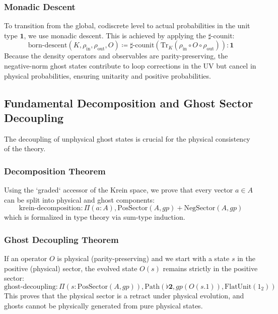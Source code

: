 \documentclass{article}
\begin{document}
\subsubsection{Monadic Descent}
To transition from the global, codiscrete level to actual probabilities in the unit type $\mathbf{1}$, we use monadic descent. This is achieved by applying the $\sharp$-counit:
\begin{equation}
    \text{born-descent}(K, \rho_{\text{in}}, \rho_{\text{out}}, O) \coloneqq \sharp\text{-counit}(\text{Tr}_K(\rho_{\text{in}} \circ O \circ \rho_{\text{out}})) : \mathbf{1}
\end{equation}
Because the density operators and observables are parity-preserving, the negative-norm ghost states contribute to loop corrections in the UV but cancel in physical probabilities, ensuring unitarity and positive probabilities.

\subsection{Fundamental Decomposition and Ghost Sector Decoupling}
\label{sec:decoupling}

The decoupling of unphysical ghost states is crucial for the physical consistency of the theory.

\subsubsection{Decomposition Theorem}
Using the `graded` accessor of the Krein space, we prove that every vector $a \in A$ can be split into physical and ghost components:
\begin{equation}
    \text{krein-decomposition} : \Pi(a:A), \text{PosSector}(A, gp) + \text{NegSector}(A, gp)
\end{equation}
which is formalized in type theory via sum-type induction.

\subsubsection{Ghost Decoupling Theorem}
If an operator $O$ is physical (parity-preserving) and we start with a state $s$ in the positive (physical) sector, the evolved state $O(s)$ remains strictly in the positive sector:
\begin{equation}
    \text{ghost-decoupling} : \Pi(s : \text{PosSector}(A, gp)), \text{Path}(\flat \mathbf{2}, gp(O(s.1)), \text{FlatUnit}(1_2))
\end{equation}
This proves that the physical sector is a retract under physical evolution, and ghosts cannot be physically generated from pure physical states.
\end{document}
